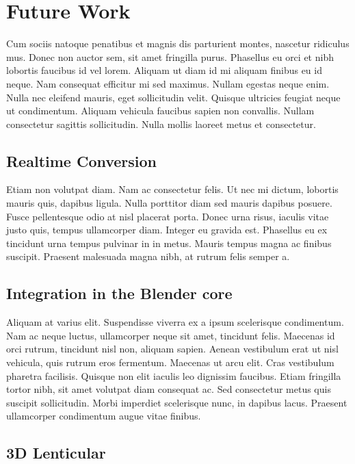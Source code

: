 \section{Future Work}

Cum sociis natoque penatibus et magnis dis parturient montes, nascetur ridiculus mus. Donec non auctor sem, sit amet fringilla purus. Phasellus eu orci et nibh lobortis faucibus id vel lorem. Aliquam ut diam id mi aliquam finibus eu id neque. Nam consequat efficitur mi sed maximus. Nullam egestas neque enim. Nulla nec eleifend mauris, eget sollicitudin velit. Quisque ultricies feugiat neque ut condimentum. Aliquam vehicula faucibus sapien non convallis. Nullam consectetur sagittis sollicitudin. Nulla mollis laoreet metus et consectetur.

\subsection{Realtime Conversion}

Etiam non volutpat diam. Nam ac consectetur felis. Ut nec mi dictum, lobortis mauris quis, dapibus ligula. Nulla porttitor diam sed mauris dapibus posuere. Fusce pellentesque odio at nisl placerat porta. Donec urna risus, iaculis vitae justo quis, tempus ullamcorper diam. Integer eu gravida est. Phasellus eu ex tincidunt urna tempus pulvinar in in metus. Mauris tempus magna ac finibus suscipit. Praesent malesuada magna nibh, at rutrum felis semper a.

\subsection{Integration in the Blender core}

Aliquam at varius elit. Suspendisse viverra ex a ipsum scelerisque condimentum. Nam ac neque luctus, ullamcorper neque sit amet, tincidunt felis. Maecenas id orci rutrum, tincidunt nisl non, aliquam sapien. Aenean vestibulum erat ut nisl vehicula, quis rutrum eros fermentum. Maecenas ut arcu elit. Cras vestibulum pharetra facilisis. Quisque non elit iaculis leo dignissim faucibus. Etiam fringilla tortor nibh, sit amet volutpat diam consequat ac. Sed consectetur metus quis suscipit sollicitudin. Morbi imperdiet scelerisque nunc, in dapibus lacus. Praesent ullamcorper condimentum augue vitae finibus. 

\subsection{3D Lenticular}

